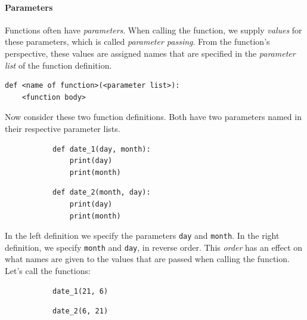 \paragraph{Parameters}

Functions often have \emph{parameters}. When calling the function, we supply \emph{values} for these parameters, which is called \emph{parameter passing}. From the function's perspective, these values are assigned names that are specified in the \emph{parameter list} of the function definition.

\begin{verbatim}
def <name of function>(<parameter list>):
    <function body>
\end{verbatim}

Now consider these two function definitions. Both have two parameters named in their respective parameter lists.

\begin{figure}[h]
\begin{subfigure}[b]{.5\linewidth}
\begin{verbatim}
def date_1(day, month):
    print(day)
    print(month)
\end{verbatim}
\end{subfigure}
\begin{subfigure}[b]{.5\linewidth}
\begin{verbatim}
def date_2(month, day):
    print(day)
    print(month)
\end{verbatim}
\end{subfigure}
\end{figure}

In the left definition we specify the parameters \texttt{day} and \texttt{month}. In the right definition, we specify \texttt{month} and \texttt{day}, in reverse order. This \emph{order} has an effect on what names are given to the values that are passed when calling the function. Let's call the functions:

\begin{figure}[h]
\begin{subfigure}[b]{.5\linewidth}
\begin{verbatim}
date_1(21, 6)
\end{verbatim}
\end{subfigure}
\begin{subfigure}[b]{.5\linewidth}
\begin{verbatim}
date_2(6, 21)
\end{verbatim}
\end{subfigure}
\end{figure}


